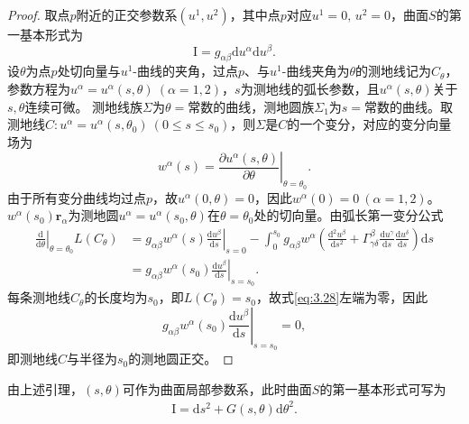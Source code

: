 \documentclass[../../main.tex]{subfiles}%
\begin{document}
\begin{proof}
取点$p$附近的正交参数系$(u^1,u^2)$，其中点$p$对应$u^1=0,\,u^2=0$，曲面$S$的第一基本形式为
$$\mathrm{I}=g_{\alpha\beta}\mathrm{d}u^\alpha\mathrm{d}u^\beta.$$
设$\theta$为点$p$处切向量与$u^1$-曲线的夹角，过点$p$、与$u^1$-曲线夹角为$\theta$的测地线记为$C_\theta$，参数方程为$u^\alpha=u^\alpha(s,\theta)\ (\alpha=1,2)$，$s$为测地线的弧长参数，且$u^\alpha(s,\theta)$关于$s,\theta$连续可微。
测地线族$\Sigma$为$\theta=\text{常数}$的曲线，测地圆族$\Sigma_1$为$s=\text{常数}$的曲线。取测地线$C:u^\alpha=u^\alpha(s,\theta_0)\ (0\leqslant s\leqslant s_0)$，则$\Sigma$是$C$的一个变分，对应的变分向量场为
$$w^\alpha(s)=\left.\frac{\partial u^\alpha(s,\theta)}{\partial\theta}\right|_{\theta=\theta_0}.$$
由于所有变分曲线均过点$p$，故$u^\alpha(0,\theta)=0$，因此$w^\alpha(0)=0\ (\alpha=1,2)$。
$w^\alpha(s_0)\boldsymbol{r}_\alpha$为测地圆$u^\alpha=u^\alpha(s_0,\theta)$在$\theta=\theta_0$处的切向量。由弧长第一变分公式
\begin{align}
\left.\frac{\mathrm{d}}{\mathrm{d}\theta}\right|_{\theta=\theta_0}L(C_\theta)&=g_{\alpha\beta}w^\alpha(s)\left.\frac{\mathrm{d}u^\beta}{\mathrm{d}s}\right|_{s=0}-\int_{0}^{s_0}g_{\alpha\beta}w^\alpha\left(\frac{\mathrm{d}^2u^\beta}{\mathrm{d}s^2}+\Gamma^\beta_{\gamma\delta}\frac{\mathrm{d}u^\gamma}{\mathrm{d}s}\frac{\mathrm{d}u^\delta}{\mathrm{d}s}\right)\mathrm{d}s\nonumber\\
&=g_{\alpha\beta}w^\alpha(s_0)\left.\frac{\mathrm{d}u^\beta}{\mathrm{d}s}\right|_{s=s_0}.
\label{eq:3.28}
\end{align}
每条测地线$C_\theta$的长度均为$s_0$，即$L(C_\theta)=s_0$，故式\eqref{eq:3.28}左端为零，因此
$$g_{\alpha\beta}w^\alpha(s_0)\left.\frac{\mathrm{d}u^\beta}{\mathrm{d}s}\right|_{s=s_0}=0,$$
即测地线$C$与半径为$s_0$的测地圆正交。
\end{proof}

由上述引理，$(s,\theta)$可作为曲面局部参数系，此时曲面$S$的第一基本形式可写为
\begin{align}
\mathrm{I}=\mathrm{d}s^2+G(s,\theta)\mathrm{d}\theta^2.
\label{eq:3.29}
\end{align}
\end{document}
